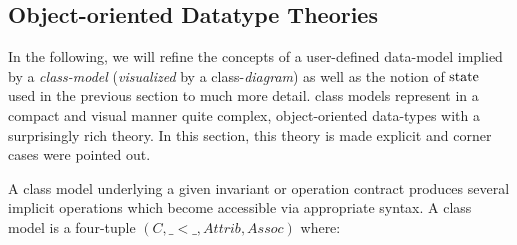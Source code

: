 \subsection{Object-oriented Datatype Theories}
In the following, we will refine the concepts of a user-defined
data-model implied by a \emph{class-model} (\emph{visualized} by a class-\emph{diagram})
as well as the notion of $\state{}$ used in the
previous section to much more detail.  \UML class models represent in a compact 
and visual manner quite complex, object-oriented data-types with a surprisingly rich
theory. In this section, this theory is made explicit
and corner cases were pointed out. 

A \UML class model underlying a
given \OCL invariant or operation contract
produces several implicit operations which
become accessible via appropriate \OCL syntax.
A class model is a four-tuple $(C, \_ < \_, Attrib, Assoc)$ where:

